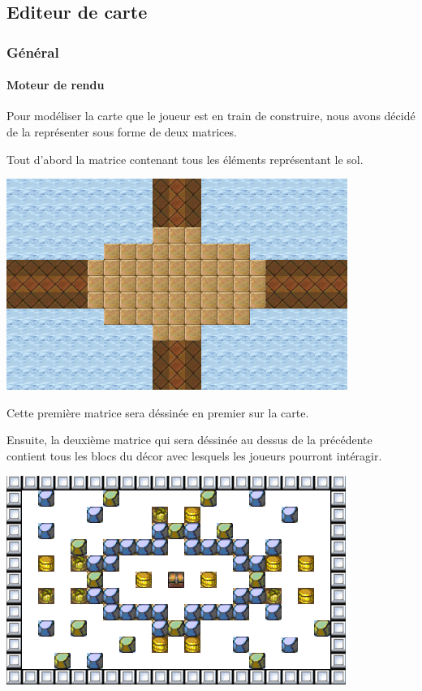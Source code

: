 			

\subsection{Editeur de carte}

	\hypertarget{Editeur de carte}{}
	\label{Editeur de carte}
	
	\subsubsection{Général}
		\paragraph{Moteur de rendu\\}
			Pour modéliser la carte que le joueur est en train de construire, nous avons décidé de la représenter sous forme de deux matrices. 
			
			Tout d'abord la matrice contenant tous les éléments représentant le sol.
			\begin{center}
				\includegraphics{./Developpement/Img/image1.png}
			\end{center}
			Cette première matrice sera déssinée en premier sur la carte.
			
			Ensuite, la deuxième matrice qui sera déssinée au dessus de la précédente contient tous les blocs du décor avec lesquels les joueurs pourront intéragir. 
			\begin{center}
				\includegraphics{./Developpement/Img/image2.png}
			\end{center}
			
